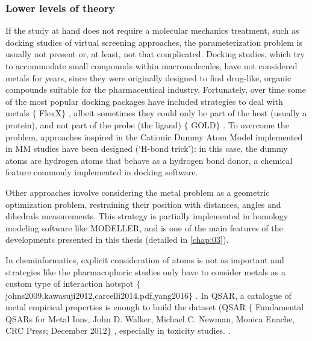 \subsubsection{Lower levels of theory}
If the study at hand does not require a molecular mechanics treatment, such as docking studies of virtual screening approaches, the parameterization problem is usually not present or, at least, not that complicated. Docking studies, which try to accommodate small compounds within macromolecules, have not considered metals for years, since they were originally designed to find drug-like, organic compounds suitable for the pharmaceutical industry. Fortunately, over time some of the most popular docking packages have included strategies to deal with metals $ \{ $ FlexX$ \} $ , albeit sometimes they could only be part of the host (usually a protein), and not part of the probe (the ligand) $ \{ $ GOLD$ \} $ . To overcome the problem, approaches inspired in the Cationic Dummy Atom Model implemented in MM studies have been designed (‘H-bond trick’): in this case, the dummy atoms are hydrogen atoms that behave as a hydrogen bond donor, a chemical feature commonly implemented in docking software.

Other approaches involve considering the metal problem as a geometric optimization problem, restraining their position with distances, angles and dihedrals measurements. This strategy is partially implemented in homology modeling software like MODELLER, \cite{Sali1993} and is one of the main features of the developments presented in this thesis (detailed in \autoref{chap:03}).

In cheminformatics, explicit consideration of atoms is not as important and strategies like the pharmacophoric studies only have to consider metals as a custom type of interaction hotspot $ \{ $ johns2009,kawasuji2012,carcelli2014.pdf,yang2016$ \} $ . In QSAR, a catalogue of metal empirical properties is enough to build the dataset (QSAR $ \{ $ Fundamental QSARs for Metal Ions, John D. Walker, Michael C. Newman, Monica Enache, CRC Press; December 2012$ \} $ , especially in toxicity studies. \cite{enache2003,can2007,puzyn2011,gajewicz2014,pan2016}.

